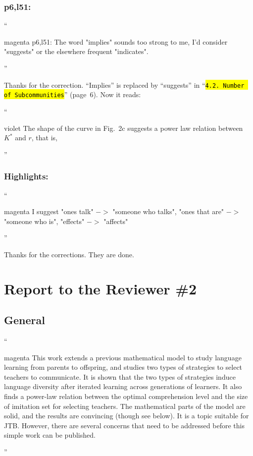 \documentclass[10.5pt]{amsart}
\newcommand{\reffig}[1]{Fig.~\ref{#1}}
\newcommand{\hbColorReviewer}{magenta}
\newcommand{\hbColorManuscript}{violet}
\newenvironment{hbReviewer}
	{\list{}{\leftmargin=2cm\rightmargin=1cm}\item[]``\begin{footnotesize}
	\begin{color}{\hbColorReviewer}}	
	{\end{color}\end{footnotesize}''\endlist}
\newcommand{\hbMRefP}[2]{``\texttt{{\color{\hbColorManuscript}\hl{#1}}}''  (page~#2)}
\newenvironment{hbChanged}
	{\list{}{\leftmargin=1cm\rightmargin=1.5cm}\item[]``\begin{small}
	\begin{color}{\hbColorManuscript}}	
	{\end{color}\end{small}''\endlist}
\newcommand{\hbMNumberOfSubcommunities}{\hbMRefP{4.2. Number of Subcommunities}{6}}
\newcommand{\hbOpt}[1]{{#1}^*}
\begin{document}
\subsubsection{p6,l51:}
\begin{hbReviewer}
	p6,l51: 
	The word "implies" sounds too strong to me, I'd consider "suggests" or 
	the elsewhere frequent "indicates".
\end{hbReviewer}

Thanks for the correction.
``Implies'' is replaced by ``suggests'' in \hbMNumberOfSubcommunities.
Now it reads:
	\begin{hbChanged}
	The shape of the curve in 
	Fig.~2c %
	suggests a power law relation between $\hbOpt{K}$ and $r$, 
	that is,
\end{hbChanged}




\subsubsection{Highlights:}
\begin{hbReviewer}
	I suggest 
	"ones talk" $->$ "someone who talks", 
	"ones that are" $->$ "someone who is", 
	"effects" $->$ "affects"
\end{hbReviewer}

Thanks for the corrections. They are done.







\section{Report to the Reviewer \#2}




\subsection{General}
\begin{hbReviewer}
	This work extends a previous mathematical model 
	to study language learning from parents to offspring, 
	and studies two types of strategies to select teachers to communicate. 
	It is shown that the two types of strategies induce language diversity 
	after iterated learning across generations of learners. 
	It also finds a power-law relation between the optimal comprehension level 
	and the size of imitation set for selecting teachers. 
	The mathematical parts of the model are solid, 
	and the results are convincing (though see below). 
	It is a topic suitable for JTB. 
	However, there are several concerns 
	that need to be addressed before this simple work can be published. 
\end{hbReviewer}
\end{document}

